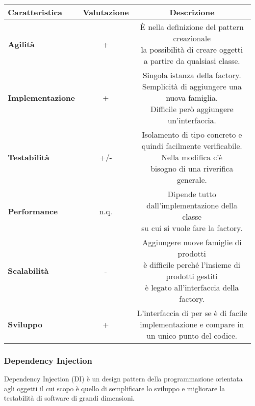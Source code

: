 {{{\begin{itemize}
				\small %
				{\renewcommand\arraystretch{1.2} %
					\begin{center} \begin{tabular}{|l|c|c|}
						\hline
						{\textbf{Caratteristica}}&{\textbf{Valutazione}}&{\textbf{Descrizione}}\\
						\hline
						\textbf{Agilità} & + &  \minitab[c]{È nella definizione del pattern creazionale\\la possibilità di creare oggetti\\a partire da qualsiasi classe.} \\
						\hline
						\textbf{Implementazione} & + &  \minitab[c]{Singola istanza della factory.\\Semplicità di aggiungere una nuova famiglia.\\Difficile però aggiungere un'interfaccia.} \\
						\hline
						\textbf{Testabilità} & +/- &  \minitab[c]{Isolamento di tipo concreto e quindi facilmente verificabile.\\ Nella modifica c'è\\bisogno di una riverifica generale.} \\
						\hline
						\textbf{Performance} & n.q. &  \minitab[c]{Dipende tutto dall'implementazione della classe\\su cui si vuole fare la factory.} \\
						\hline
						\textbf{Scalabilità} & - &  \minitab[c]{Aggiungere nuove famiglie di prodotti\\è difficile perché l’insieme di prodotti gestiti\\è legato all'interfaccia della factory.}\\
						\hline
						\textbf{Sviluppo} & + &  \minitab[c]{L'interfaccia di per se è di facile\\implementazione e compare in un unico punto del codice.} \\
						\hline
					\end{tabular} \end{center}
				}
			\end{itemize}
		}
	
		\subsubsection{Dependency Injection}{
			Dependency Injection (DI) è un design pattern della programmazione orientata agli oggetti il cui scopo è quello di semplificare lo sviluppo e migliorare la testabilità di software di grandi dimensioni.
			
}}}
